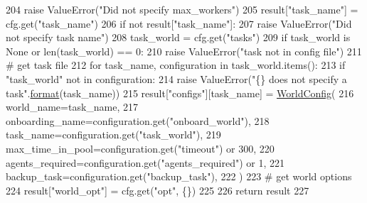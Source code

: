 \begin{DoxyCode}
204             \textcolor{keywordflow}{raise} ValueError(\textcolor{stringliteral}{"Did not specify max\_workers"})
205         result[\textcolor{stringliteral}{"task\_name"}] = cfg.get(\textcolor{stringliteral}{"task\_name"})
206         \textcolor{keywordflow}{if} \textcolor{keywordflow}{not} result[\textcolor{stringliteral}{"task\_name"}]:
207             \textcolor{keywordflow}{raise} ValueError(\textcolor{stringliteral}{"Did not specify task name"})
208         task\_world = cfg.get(\textcolor{stringliteral}{"tasks"})
209         \textcolor{keywordflow}{if} task\_world \textcolor{keywordflow}{is} \textcolor{keywordtype}{None} \textcolor{keywordflow}{or} len(task\_world) == 0:
210             \textcolor{keywordflow}{raise} ValueError(\textcolor{stringliteral}{"task not in config file"})
211         \textcolor{comment}{# get task file}
212         \textcolor{keywordflow}{for} task\_name, configuration \textcolor{keywordflow}{in} task\_world.items():
213             \textcolor{keywordflow}{if} \textcolor{stringliteral}{"task\_world"} \textcolor{keywordflow}{not} \textcolor{keywordflow}{in} configuration:
214                 \textcolor{keywordflow}{raise} ValueError(\textcolor{stringliteral}{"\{\} does not specify a task"}.\hyperlink{namespaceparlai_1_1mturk_1_1core_1_1shared__utils_afcac728e96b38bbad8cde6f7be4f613e}{format}(task\_name))
215             result[\textcolor{stringliteral}{"configs"}][task\_name] = \hyperlink{namespaceparlai_1_1chat__service_1_1services_1_1messenger_1_1shared__utils_a2fad0a70ab62b27b2692978de3a852f1}{WorldConfig}(
216                 world\_name=task\_name,
217                 onboarding\_name=configuration.get(\textcolor{stringliteral}{"onboard\_world"}),
218                 task\_name=configuration.get(\textcolor{stringliteral}{"task\_world"}),
219                 max\_time\_in\_pool=configuration.get(\textcolor{stringliteral}{"timeout"}) \textcolor{keywordflow}{or} 300,
220                 agents\_required=configuration.get(\textcolor{stringliteral}{"agents\_required"}) \textcolor{keywordflow}{or} 1,
221                 backup\_task=configuration.get(\textcolor{stringliteral}{"backup\_task"}),
222             )
223         \textcolor{comment}{# get world options}
224         result[\textcolor{stringliteral}{"world\_opt"}] = cfg.get(\textcolor{stringliteral}{"opt"}, \{\})
225 
226     \textcolor{keywordflow}{return} result
227 \end{DoxyCode}
\mbox{\label{namespaceparlai_1_1chat__service_1_1services_1_1messenger_1_1shared__utils_aec85b06c02b1d4c28a9a6bbcc5cdad1b}} 
